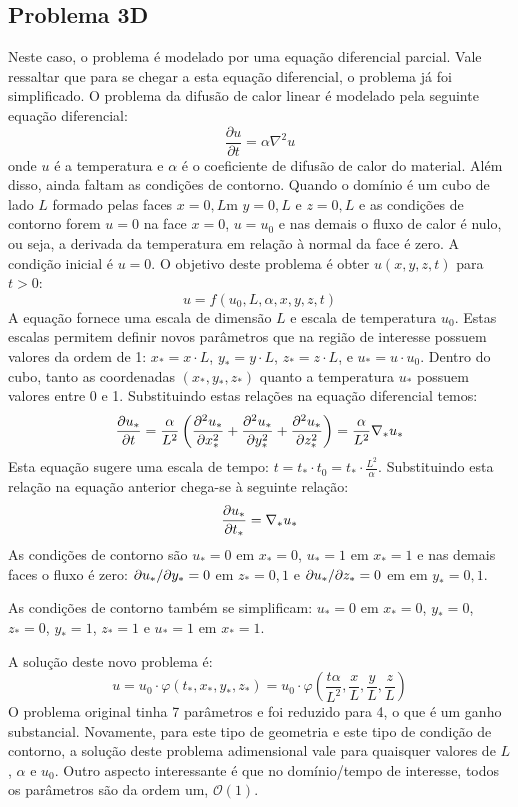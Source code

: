 \subsection{Problema 3D}
Neste caso, o problema é modelado por uma equação diferencial parcial. Vale ressaltar que para se chegar a esta equação diferencial, o problema já foi simplificado. O problema da difusão de calor linear é modelado pela seguinte equação diferencial:
\[
\frac{\partial u}{\partial t} = \alpha\nabla^2 u
\]
onde $u$ é a temperatura e $\alpha$ é o coeficiente de difusão de calor do material. Além disso, ainda faltam as condições de contorno. Quando o domínio é um cubo de lado $L$ formado pelas faces $x=0,L$m $y=0,L$ e $z=0,L$ e as condições de contorno forem $u=0$ na face $x=0$, $u=u_0$ e nas demais o fluxo de calor é nulo, ou seja, a derivada da temperatura em relação à normal da face é zero. A condição inicial é $u=0$. O objetivo deste problema é obter $u(x,y,z,t)$ para $t>0$:
\[
u = f(u_0, L, \alpha, x, y, z, t)
\]
A equação fornece uma escala de dimensão $L$ e escala de temperatura $u_0$. Estas escalas permitem definir novos parâmetros que na região de interesse possuem valores da ordem de 1: $x_* = x\cdot L$, $y_* = y\cdot L$, $z_* = z\cdot L$, e $u_* = u\cdot u_0$. Dentro do cubo, tanto as coordenadas $(x_*, y_*, z_*)$ quanto a temperatura $u_*$  possuem valores entre 0 e 1. Substituindo estas relações na equação diferencial temos:
\[
\frac{\partial u_*}{\partial t} = \frac{\alpha}{L^2}\left(\frac{\partial^2 u_*}{\partial x_*^2} + \frac{\partial^2 u_*}{\partial y_*^2} + \frac{\partial^2 u_*}{\partial z_*^2} \right) = \frac{\alpha}{L^2} \nabla_* u_*
\]
Esta equação sugere uma escala de tempo: $t = t_*\cdot t_0 = t_* \cdot \frac{L^2}{\alpha}$. Substituindo esta relação na equação anterior chega-se à seguinte relação:
\[
\frac{\partial u_*}{\partial t_*} =\nabla_* u_*
\]
As condições de contorno são $u_*=0$ em $x_*=0$, $u_*=1$ em $x_*=1$ e nas demais faces o fluxo é zero: $\partial u_*/\partial y_* = 0$ em $z_*=0,1$ e $\partial u_*/\partial z_* = 0$ em em $y_*=0,1$.


As condições de contorno também se simplificam: $u_*=0$ em $x_*=0$, $y_*=0$, $z_*=0$, $y_*=1$, $z_*=1$ e $u_* = 1$ em $x_* = 1$. 

A solução deste novo problema é:
\[
u = u_0 \cdot \varphi(t_*, x_*, y_*, z_*) = u_0\cdot\varphi\left(\frac{t\alpha}{L^2}, \frac{x}{L}, 
 \frac{y}{L} , \frac{z}{L}\right)
\]
O problema original tinha 7 parâmetros e foi reduzido para 4, o que é um ganho substancial. Novamente, para este tipo de geometria e este tipo de condição de contorno, a solução deste problema adimensional vale para quaisquer valores de $L$, $\alpha$ e $u_0$. Outro aspecto interessante é que no domínio/tempo de interesse, todos os parâmetros são da ordem um, $\mathcal{O}(1)$.

